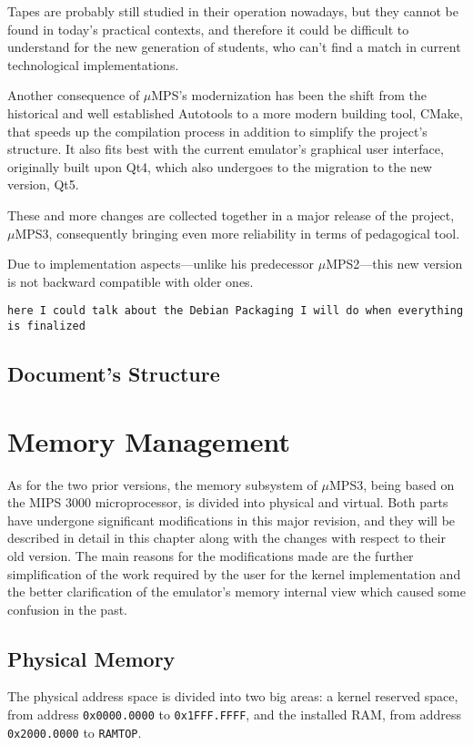 \documentclass[12pt,a4paper,openright,twoside]{report}
\begin{document}
	Tapes are probably still studied in their operation nowadays, but they cannot be found in today's practical contexts, and therefore it could be difficult to understand for the new generation of students, who can't find a match in current technological implementations.
	
	Another consequence of $\mu$MPS's modernization has been the shift from the historical and well established Autotools to a more modern building tool, CMake, that speeds up the compilation process in addition to simplify the project's structure.
	It also fits best with the current emulator's graphical user interface, originally built upon Qt4, which also undergoes to the migration to the new version, Qt5.
	
	These and more changes are collected together in a major release of the project, $\mu$MPS3, consequently bringing even more reliability in terms of pedagogical tool.
	
	Due to implementation aspects---unlike his predecessor $\mu$MPS2---this new version is not backward compatible with older ones.

	\texttt{here I could talk about the Debian Packaging I will do when everything is finalized}
\section{Document's Structure}
\chapter{Memory Management}
\lhead[\fancyplain{}{\bfseries\thepage}]{\fancyplain{}{\bfseries\rightmark}}
	As for the two prior versions, the memory subsystem of $\mu$MPS3, being based on the MIPS 3000 microprocessor, is divided into physical and virtual.
	Both parts have undergone significant modifications in this major revision, and they will be described in detail in this chapter along with the changes with respect to their old version.
	The main reasons for the modifications made are the further simplification of the work required by the user for the kernel implementation and the better clarification of the emulator's memory internal view which caused some confusion in the past.

\section{Physical Memory}
	The physical address space is divided into two big areas: a kernel reserved space, from address \texttt{0x0000.0000} to \texttt{0x1FFF.FFFF}, and the installed RAM, from address \texttt{0x2000.0000} to \texttt{RAMTOP}.
\end{document}
